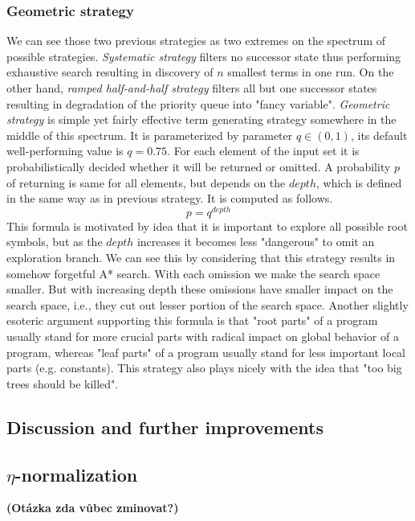 \documentclass{llncs}
\begin{document}
\subsubsection{Geometric strategy}

We can see those two previous strategies as two extremes on the spectrum of 
possible strategies. 
\textit{Systematic strategy} filters no successor state thus performing
exhaustive search resulting in discovery of $n$ smallest terms in one run.
On the other hand, \textit{ramped half-and-half strategy} filters 
all but one successor states resulting in degradation of 
the priority queue into "fancy variable".
\textit{Geometric strategy} is simple yet fairly effective term generating 
strategy somewhere in the middle of this spectrum.
It is parameterized by parameter $q \in (0,1)$, its default well-performing 
value is $q = 0.75$.
For each element of the input set 
it is probabilistically decided whether
it will be returned or omitted. A probability $p$ of returning is
same for all elements, but depends on the $depth$, 
which is defined in the same way as in previous strategy. 
It is computed as follows.
$$ p = q^{depth} $$
This formula is motivated by idea that it is important to
explore all possible root symbols, but as the $depth$ 
increases it becomes less "dangerous" to omit 
an exploration branch. 
We can see this by considering that this strategy results in
somehow forgetful A* search.
With each omission we make the search space smaller. But with
increasing depth these omissions have smaller impact on the search space,
i.e., they cut out lesser portion of the search space.
Another slightly esoteric argument supporting this formula is that "root 
parts" of a program usually stand for more crucial parts
with radical impact on global behavior of a program, 
whereas "leaf parts" of a program usually
stand for less important local parts (e.g. constants).  
This strategy also plays nicely with the idea that 
"too big trees should be killed".


\subsection{Discussion and further improvements}

\subsection{$\eta$-normalization}

\textbf{(Otázka zda vůbec zminovat?)}
\end{document}
